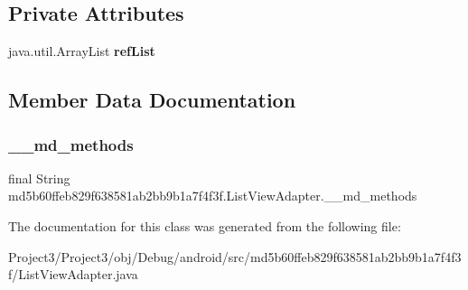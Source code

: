 \subsection*{Private Attributes}
\begin{DoxyCompactItemize}
\item 
\mbox{\label{classmd5b60ffeb829f638581ab2bb9b1a7f4f3f_1_1ListViewAdapter_a2b206b389692997413bd835dceb3d7ec}} 
java.\+util.\+Array\+List {\bfseries ref\+List}
\end{DoxyCompactItemize}


\subsection{Member Data Documentation}
\mbox{\label{classmd5b60ffeb829f638581ab2bb9b1a7f4f3f_1_1ListViewAdapter_a3484b09d18c193e3a6efbf9abd22592a}} 
\subsubsection{\texorpdfstring{\+\_\+\+\_\+md\+\_\+methods}{\_\_md\_methods}}
{\footnotesize\ttfamily final String md5b60ffeb829f638581ab2bb9b1a7f4f3f.\+List\+View\+Adapter.\+\_\+\+\_\+md\+\_\+methods\hspace{0.3cm}{\ttfamily [static]}}



The documentation for this class was generated from the following file\+:\begin{DoxyCompactItemize}
\item 
Project3/\+Project3/obj/\+Debug/android/src/md5b60ffeb829f638581ab2bb9b1a7f4f3f/List\+View\+Adapter.\+java\end{DoxyCompactItemize}
